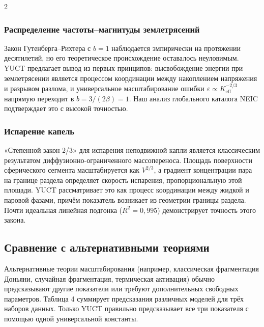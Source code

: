 \documentclass[11pt,a4paper]{article}
\newcommand{\eps}{\varepsilon}
\newcommand{\Keff}{K_{\mathrm{eff}}}
\newcommand{\betaf}{\beta}
\begin{document}
\begin{multicols}{2}
		\subsubsection{Распределение частоты–магнитуды землетрясений}
		Закон Гутенберга–Рихтера с \(b = 1\) наблюдается эмпирически на протяжении десятилетий, но его теоретическое происхождение оставалось неуловимым. YUCT предлагает вывод из первых принципов: высвобождение энергии при землетрясении является процессом координации между накоплением напряжения и разрывом разлома, и универсальное масштабирование ошибки \(\eps \propto \Keff^{-2/3}\) напрямую переходит в \(b = 3/(2\betaf) = 1\). Наш анализ глобального каталога NEIC подтверждает это с высокой точностью.
		
		\subsubsection{Испарение капель}
		«Степенной закон 2/3» для испарения неподвижной капли является классическим результатом диффузионно-ограниченного массопереноса. Площадь поверхности сферического сегмента масштабируется как \(V^{2/3}\), а градиент концентрации пара на границе раздела определяет скорость испарения, пропорциональную этой площади. YUCT рассматривает это как процесс координации между жидкой и паровой фазами, причём показатель возникает из геометрии границы раздела. Почти идеальная линейная подгонка (\(R^2 = 0,995\)) демонстрирует точность этого закона.
		
		\subsection{Сравнение с альтернативными теориями}
		
		Альтернативные теории масштабирования (например, классическая фрагментация Доньяни, случайная фрагментация, термическая активация) обычно предсказывают другие показатели или требуют дополнительных свободных параметров. Таблица 4 суммирует предсказания различных моделей для трёх наборов данных. Только YUCT правильно предсказывает все три показателя с помощью одной универсальной константы.
		

\end{multicols}
\end{document}
